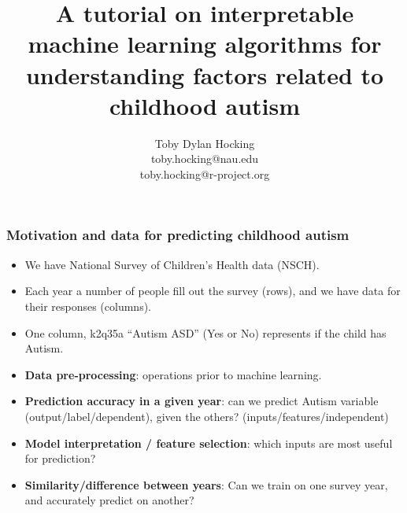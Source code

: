 \documentclass{beamer}
\begin{document}
\title{A tutorial on interpretable machine learning algorithms for understanding factors related to childhood autism}

\author{
  Toby Dylan Hocking\\
  toby.hocking@nau.edu\\
  toby.hocking@r-project.org\\
}

\maketitle

\begin{frame}
  \frametitle{Motivation and data for predicting childhood autism}
  \begin{itemize}
  \item We have National Survey of Children's Health data (NSCH).
  \item Each year a number of people fill out the survey (rows), and
    we have data for their responses (columns).
  \item One column, k2q35a ``Autism ASD'' (Yes or No) represents if
    the child has Autism.
  \item \textbf{Data pre-processing}: operations prior to machine
    learning.
  \item \textbf{Prediction accuracy in a given year}: can we predict
    Autism variable (output/label/dependent), given the others?
    (inputs/features/independent)
  \item \textbf{Model interpretation / feature selection}: which
    inputs are most useful for prediction?
  \item \textbf{Similarity/difference between years}: Can we train
    on one survey year, and accurately predict on another?
  \end{itemize}
\end{frame}
\end{document}
